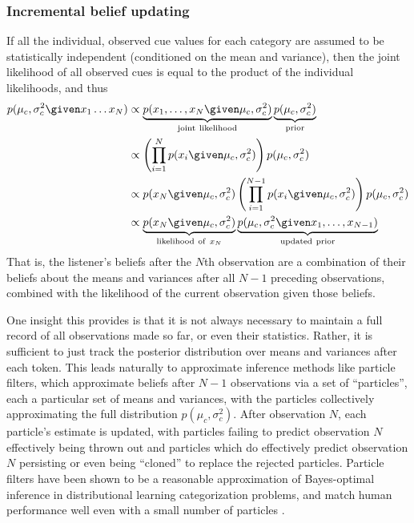 \subsubsection{Incremental belief updating}
\label{sec:incr-beli-updat}

If all the individual, observed cue values for each category are assumed to be statistically independent (conditioned on the mean and variance), then the joint likelihood of all observed cues is equal to the product of the individual likelihoods, and thus
\begin{align}
  \label{eq:6}
  p(\mu_c, \sigma^2_c \given x_1 \ldots x_N) &\propto \underbrace{p(x_1, \ldots, x_N \given \mu_c, \sigma^2_c)}_{\mathrm{joint\ likelihood}} \underbrace{p(\mu_c, \sigma^2_c)}_{\mathrm{prior}} \\
  &\propto \left( \prod_{i=1}^N p(x_i \given \mu_c, \sigma^2_c)  \right) p(\mu_c, \sigma^2_c) \\
  &\propto p(x_N \given \mu_c, \sigma^2_c) \left( \prod_{i=1}^{N-1} p(x_i \given \mu_c, \sigma^2_c)  \right) p(\mu_c, \sigma^2_c) \\
  &\propto \underbrace{p(x_N \given \mu_c, \sigma^2_c)}_{\mathrm{likelihood\ of\ }x_N} \underbrace{p(\mu_c, \sigma^2_c \given x_1, \ldots, x_{N-1})}_{\mathrm{updated\ prior}}
\end{align}
That is, the listener's beliefs after the $N$th observation are a combination of their beliefs about the means and variances after all $N-1$ preceding observations, combined with the likelihood of the current observation given those beliefs.

One insight this provides is that it is not always necessary to maintain a full record of all observations made so far, or even their statistics.  Rather, it is sufficient to just track the posterior distribution over means and variances after each token.  This leads naturally to approximate inference methods like particle filters, which approximate beliefs after $N-1$ observations via a set of ``particles'', each a particular set of means and variances, with the particles collectively approximating the full distribution $p(\mu_c, \sigma^2_c)$.  After observation $N$, each particle's estimate is updated, with particles failing to predict observation $N$ effectively being thrown out and particles which do effectively predict observation $N$ persisting or even being ``cloned'' to replace the rejected particles.  Particle filters have been shown to be a reasonable approximation of Bayes-optimal inference in distributional learning categorization problems, and match human performance well even with a small number of particles \autocite{Sanborn2010}.


